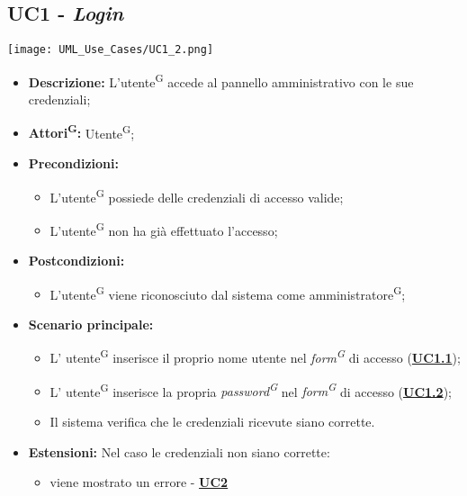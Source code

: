\subsection{UC1 - \textit{Login}}
\label{sec:UC1}
\texttt{[image: UML\_Use\_Cases/UC1\_2.png]}
\begin{itemize}
	\item \textbf{Descrizione:} L’utente\textsuperscript{G} accede al pannello amministrativo con le sue credenziali;
	\item \textbf{Attori\textsuperscript{G}:} Utente\textsuperscript{G};
	\item \textbf{Precondizioni:} 
	\begin{itemize}
		\item L’utente\textsuperscript{G} possiede delle credenziali di accesso valide;
		\item L’utente\textsuperscript{G} non ha già effettuato l’accesso;
	\end{itemize}
	\item \textbf{Postcondizioni:} 
	\begin{itemize}
		\item L’utente\textsuperscript{G} viene riconosciuto dal sistema come amministratore\textsuperscript{G};
	\end{itemize}
	\item \textbf{Scenario principale:} 
	\begin{itemize}
		\item L’ utente\textsuperscript{G} inserisce il proprio nome utente nel \textit{form\textsuperscript{G}} di accesso (\hyperref[sec:UC1.1]{\textbf{UC1.1}});
		\item L’ utente\textsuperscript{G} inserisce la propria \textit{password\textsuperscript{G}} nel \textit{form\textsuperscript{G}} di accesso (\hyperref[sec:UC1.2]{\textbf{UC1.2}});
		\item Il sistema verifica che le credenziali ricevute siano corrette. 
	\end{itemize}
	\item \textbf{Estensioni:} Nel caso le credenziali non siano corrette:
	\begin{itemize}
		\item viene mostrato un errore - \hyperref[sec:UC2]{\textbf{UC2}}
	\end{itemize}
\end{itemize}

